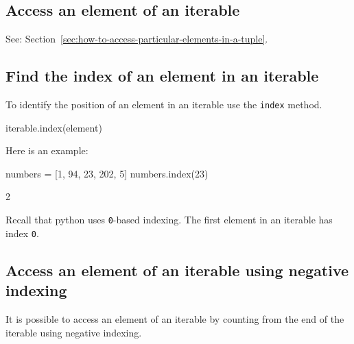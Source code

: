 \begin{raw}
[1, 6, 10, 20, 50, 50, 105]
\end{raw}





\subsection{Access an element of an iterable}
\label{\detokenize{building-tools/02-functions-and-data-structures/how/main:access-an-element-of-an-iterable}}

See: Section~\ref{sec:how-to-access-particular-elements-in-a-tuple}.


\subsection{Find the index of an element in an iterable}

To identify the position of an element in an iterable use the \texttt{index} method.


\begin{api}
iterable.index(element)
\end{api}



Here is an example:




\begin{pyin}
numbers = [1, 94, 23, 202, 5]
numbers.index(23)
\end{pyin}





\begin{raw}
2
\end{raw}


\begin{note}
Recall that python uses \texttt{0}-based indexing. The first element in an iterable has
index \texttt{0}.
\end{note}



\subsection{Access an element of an iterable using negative indexing}
\label{sec:access_an_element_of_an_iterable_using_negative_indexing}

It is possible to access an element of an iterable by counting from the end of
the iterable using negative indexing.


